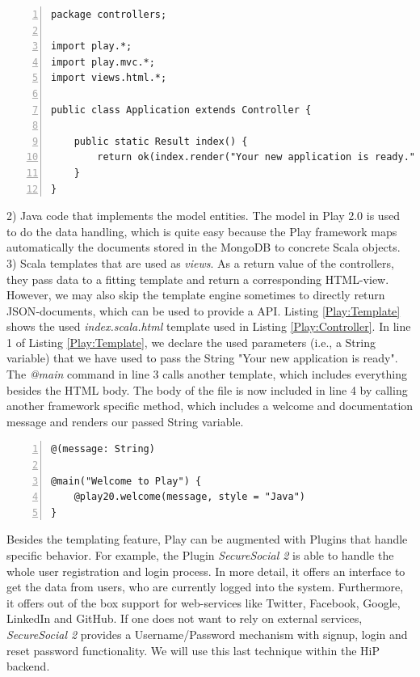 \begin{lstlisting}[numbers=left,caption={Simple Java-controller within the Play Framework.},label=Play:Controller,frame=tlbr,breaklines]
package controllers;

import play.*;
import play.mvc.*;
import views.html.*;

public class Application extends Controller {

    public static Result index() {
        return ok(index.render("Your new application is ready."));
    }
}
\end{lstlisting}

2) Java code that implements the model entities. The model in Play 2.0 is used to do the data handling, which is quite easy because the Play framework maps automatically the documents stored in the MongoDB to concrete Scala objects. \\
3) Scala templates that are used as \textit{views}. As a return value of the controllers, they pass data to a fitting template and return a corresponding \ac{HTML}-view. However, we may also skip the template engine sometimes to directly return \ac{JSON}-documents, which can be used to provide a \ac{API}. Listing \ref{Play:Template} shows the used \textit{index.scala.html} template used in Listing \ref{Play:Controller}. In line 1 of Listing \ref{Play:Template}, we declare the used parameters (i.e., a String variable) that we have used to pass the String "Your new application is ready". The \textit{@main} command in line 3 calls another template, which includes everything besides the \ac{HTML} body. The body of the file is now included in line 4 by calling another framework specific method, which includes a welcome and documentation message and renders our passed String variable.

\begin{lstlisting}[numbers=left,caption={Simple Scala template within the Play Framework.},label=Play:Template,frame=tlbr,breaklines]
@(message: String)

@main("Welcome to Play") {
    @play20.welcome(message, style = "Java")
}
\end{lstlisting}

Besides the templating feature, Play can be augmented with Plugins that handle specific behavior. For example, the Plugin \emph{SecureSocial 2} is able to handle the whole user registration and login process. In more detail, it offers an interface to get the data from users, who are currently logged into the system. Furthermore, it offers out of the box support for web-services like Twitter, Facebook, Google, LinkedIn and GitHub. If one does not want to rely on external services, \emph{SecureSocial 2} provides a Username/Password mechanism with signup, login and reset password functionality. We will use this last technique within the \ac{HiP} backend.

